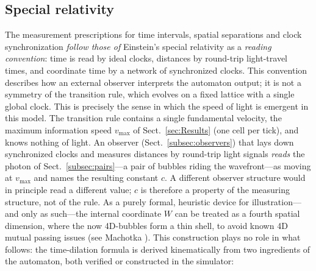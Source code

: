 \documentclass{ijuc}
\begin{document}
\subsection{Special relativity}\label{subsec:special-relativity}
The measurement prescriptions for time intervals, spatial separations and clock synchronization \emph{follow those of} Einstein's special relativity \cite{Einstein1905} as a \emph{reading convention}: time is read by ideal clocks, distances by round-trip light-travel times, and coordinate time by a network of synchronized clocks. This convention describes how an external observer interprets the automaton output; it is not a symmetry of the transition rule, which evolves on a fixed lattice with a single global clock.
This is precisely the sense in which the speed of light is emergent in this model. The transition rule contains a single fundamental velocity, the maximum information speed $v_{\max}$ of Sect.~\ref{sec:Results} (one cell per tick), and knows nothing of light. An observer (Sect.~\ref{subsec:observers}) that lays down synchronized clocks and measures distances by round-trip light signals \emph{reads} the photon of Sect.~\ref{subsec:pairs}---a pair of bubbles riding the wavefront---as moving at $v_{\max}$ and names the resulting constant $c$. A different observer structure would in principle read a different value; $c$ is therefore a property of the measuring structure, not of the rule.
As a purely formal, heuristic device for illustration---and only as such---the internal coordinate $W$ can be treated as a fourth spatial dimension, where the now 4D-bubbles form a thin shell, to avoid known 4D mutual passing issues (see Machotka \cite{Machotka2025}).  This construction plays no role in what follows: the time-dilation formula is derived kinematically from two ingredients of the automaton, both verified or constructed in the simulator:
\end{document}
